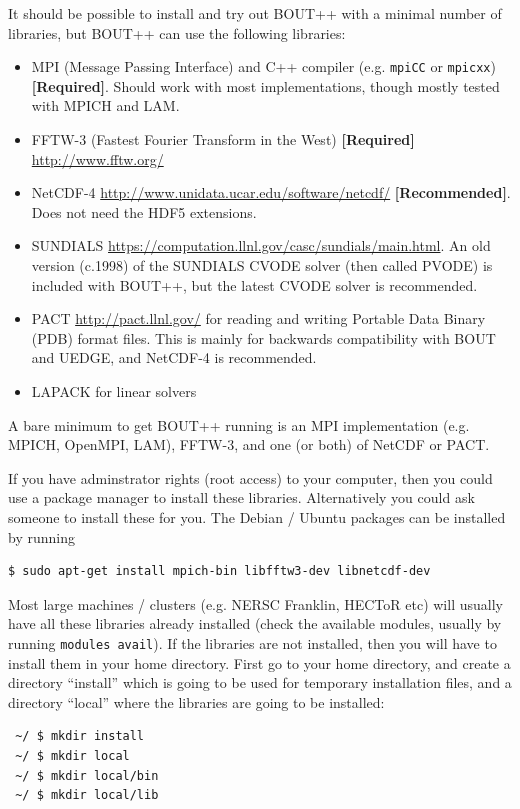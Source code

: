 \documentclass[12pt]{article}
\newcommand{\code}[1]{\texttt{#1}}
\begin{document}
It should be possible to install and try out BOUT++ with a minimal number of
libraries, but BOUT++ can use the following libraries:
\begin{itemize}
  \item MPI (Message Passing Interface) and C++ compiler (e.g. \code{mpiCC} or \code{mpicxx}) {\bf [Required]}. Should work with most implementations, though mostly tested with MPICH and LAM.
  \item FFTW-3 (Fastest Fourier Transform  in the West) {\bf [Required]} \url{http://www.fftw.org/} 
  \item NetCDF-4 \url{http://www.unidata.ucar.edu/software/netcdf/} {\bf [Recommended]}. Does not need the HDF5 extensions.
  \item SUNDIALS \url{https://computation.llnl.gov/casc/sundials/main.html}. An old version (c.1998) of the SUNDIALS CVODE solver (then called PVODE) is included with BOUT++, but the latest CVODE solver is recommended.
  \item PACT \url{http://pact.llnl.gov/} for reading and writing Portable Data Binary (PDB) format files. This is mainly for backwards compatibility with BOUT and UEDGE, and NetCDF-4 is recommended.
  \item LAPACK for linear solvers
\end{itemize}

A bare minimum to get BOUT++ running is an MPI implementation (e.g. MPICH, OpenMPI, LAM), FFTW-3, and one (or both) of NetCDF or PACT. 

If you have adminstrator rights (root access) to your computer, then you could use a package manager
to install these libraries. Alternatively you could ask someone to install these for you. The Debian / Ubuntu
packages can be installed by running
\begin{verbatim}
$ sudo apt-get install mpich-bin libfftw3-dev libnetcdf-dev
\end{verbatim}

Most large machines / clusters (e.g. NERSC Franklin, HECToR etc) will usually have all these libraries
already installed (check the available modules, usually by running \texttt{modules avail}). If the 
libraries are not installed, then you will have to install them in your home directory.
First go to your home directory, and create a directory ``install'' which is going to be used for temporary
installation files, and a directory ``local'' where the libraries are going to be installed:
\begin{verbatim}
 ~/ $ mkdir install
 ~/ $ mkdir local
 ~/ $ mkdir local/bin
 ~/ $ mkdir local/lib
\end{verbatim}
\end{document}
